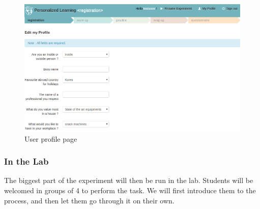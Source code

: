 \documentclass[a4paper,12pt]{article}
\makeatletter
\def\maxwidth{%
  \ifdim\Gin@nat@width>\linewidth
    \linewidth
  \else
    \Gin@nat@width
  \fi
}
\makeatother
\begin{document}
\begin{figure}[h]
\begin{center}
\includegraphics[width=\maxwidth]{registration.png}
\caption{User profile page}
\label{user profile}
\end{center}
\end{figure}


\subsubsection{In the Lab}

The biggest part of the experiment will then be run in the lab. Students will be welcomed in groups of 4 to perform the task. We will first introduce them to the process, and then let them go through it on their own.
\end{document}
